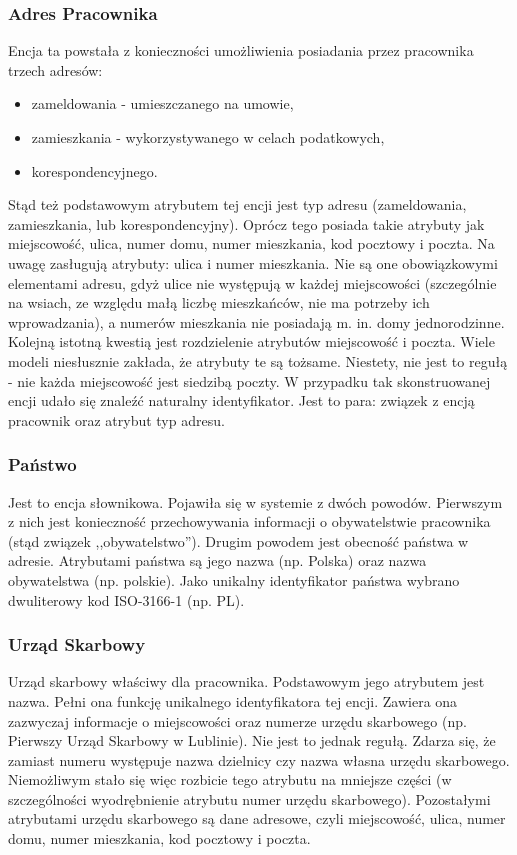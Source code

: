 \subsubsection{Adres Pracownika}
Encja ta powstała z konieczności umożliwienia posiadania przez pracownika trzech adresów: 
\begin{itemize}
	\item zameldowania - umieszczanego na umowie,
	\item zamieszkania - wykorzystywanego w celach podatkowych,
	\item korespondencyjnego.
\end{itemize}
Stąd też podstawowym atrybutem tej encji jest typ adresu (zameldowania, zamieszkania, lub korespondencyjny). Oprócz tego posiada takie atrybuty jak miejscowość, ulica, numer domu, numer mieszkania, kod pocztowy i poczta. Na uwagę zasługują atrybuty: ulica i numer mieszkania. Nie są one obowiązkowymi elementami adresu, gdyż ulice nie występują w każdej miejscowości (szczególnie na wsiach, ze względu małą liczbę mieszkańców, nie ma potrzeby ich wprowadzania), a numerów mieszkania nie posiadają m. in. domy jednorodzinne. Kolejną istotną kwestią jest rozdzielenie atrybutów miejscowość i poczta. Wiele modeli niesłusznie zakłada, że atrybuty te są tożsame. Niestety, nie jest to regułą - nie każda miejscowość jest siedzibą poczty.
W przypadku tak skonstruowanej encji udało się znaleźć naturalny identyfikator. Jest to para: związek z encją pracownik oraz atrybut typ adresu.

\subsubsection{Państwo}
Jest to encja słownikowa. Pojawiła się w systemie z dwóch powodów. Pierwszym z nich jest konieczność przechowywania informacji o obywatelstwie pracownika  (stąd związek ,,obywatelstwo''). Drugim powodem jest obecność państwa w adresie. Atrybutami państwa są jego nazwa (np. Polska) oraz nazwa obywatelstwa (np. polskie). Jako unikalny identyfikator państwa wybrano dwuliterowy kod ISO-3166-1\cite{panstwa} (np. PL).

\subsubsection{Urząd Skarbowy}
Urząd skarbowy właściwy dla pracownika. Podstawowym jego atrybutem jest nazwa. Pełni ona funkcję unikalnego identyfikatora tej encji. Zawiera ona zazwyczaj informacje o miejscowości oraz numerze urzędu skarbowego (np. Pierwszy Urząd Skarbowy w Lublinie). Nie jest to jednak regułą. Zdarza się, że zamiast numeru występuje nazwa dzielnicy czy nazwa własna urzędu skarbowego. Niemożliwym stało się więc rozbicie tego atrybutu na mniejsze części (w szczególności wyodrębnienie atrybutu numer urzędu skarbowego). Pozostałymi atrybutami urzędu skarbowego są dane adresowe, czyli miejscowość, ulica, numer domu, numer mieszkania, kod pocztowy i poczta.

